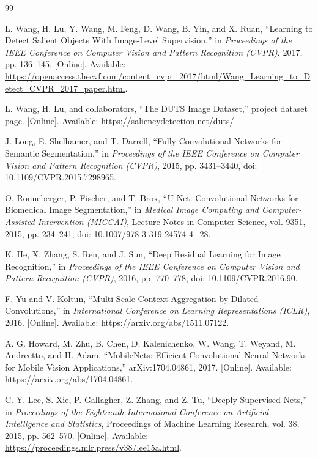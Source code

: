 \documentclass[10pt,a4paper,twocolumn]{article}
\begin{document}
\begin{thebibliography}{99}
\small

L. Wang, H. Lu, Y. Wang, M. Feng, D. Wang, B. Yin, and X. Ruan,
``Learning to Detect Salient Objects With Image-Level Supervision,''
in \emph{Proceedings of the IEEE Conference on Computer Vision and Pattern Recognition (CVPR)},
2017, pp. 136--145.
[Online]. Available: \url{https://openaccess.thecvf.com/content_cvpr_2017/html/Wang_Learning_to_Detect_CVPR_2017_paper.html}.

L. Wang, H. Lu, and collaborators,
``The DUTS Image Dataset,'' project dataset page.
[Online]. Available: \url{https://saliencydetection.net/duts/}.

J. Long, E. Shelhamer, and T. Darrell,
``Fully Convolutional Networks for Semantic Segmentation,''
in \emph{Proceedings of the IEEE Conference on Computer Vision and Pattern Recognition (CVPR)},
2015, pp. 3431--3440, doi: 10.1109/CVPR.2015.7298965.

O. Ronneberger, P. Fischer, and T. Brox,
``U-Net: Convolutional Networks for Biomedical Image Segmentation,''
in \emph{Medical Image Computing and Computer-Assisted Intervention (MICCAI)},
Lecture Notes in Computer Science, vol. 9351, 2015, pp. 234--241,
doi: 10.1007/978-3-319-24574-4\_28.

K. He, X. Zhang, S. Ren, and J. Sun,
``Deep Residual Learning for Image Recognition,''
in \emph{Proceedings of the IEEE Conference on Computer Vision and Pattern Recognition (CVPR)},
2016, pp. 770--778, doi: 10.1109/CVPR.2016.90.

F. Yu and V. Koltun,
``Multi-Scale Context Aggregation by Dilated Convolutions,''
in \emph{International Conference on Learning Representations (ICLR)}, 2016.
[Online]. Available: \url{https://arxiv.org/abs/1511.07122}.

A. G. Howard, M. Zhu, B. Chen, D. Kalenichenko, W. Wang, T. Weyand,
M. Andreetto, and H. Adam,
``MobileNets: Efficient Convolutional Neural Networks for Mobile Vision Applications,''
arXiv:1704.04861, 2017. [Online]. Available: \url{https://arxiv.org/abs/1704.04861}.

C.-Y. Lee, S. Xie, P. Gallagher, Z. Zhang, and Z. Tu,
``Deeply-Supervised Nets,''
in \emph{Proceedings of the Eighteenth International Conference on Artificial Intelligence and Statistics},
Proceedings of Machine Learning Research, vol. 38, 2015, pp. 562--570.
[Online]. Available: \url{https://proceedings.mlr.press/v38/lee15a.html}.


\end{thebibliography}
\end{document}
